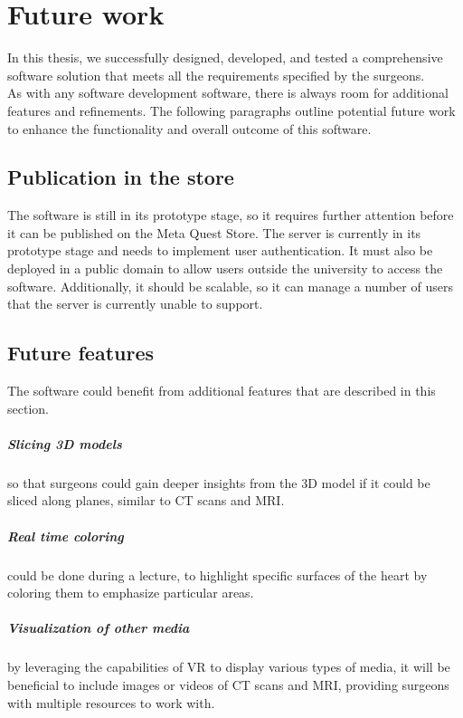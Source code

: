 
\chapter{Future work}
\label{chp:conclusions}
\noindent
In this thesis, we successfully designed, developed, and tested a comprehensive software solution that meets all the requirements specified by the surgeons.\\
As with any software development software, there is always room for additional features and refinements. The following paragraphs outline potential future work to enhance the functionality and overall outcome of this software.

\section{Publication in the store}
\noindent
The software is still in its prototype stage, so it requires further attention before it can be published on the Meta Quest Store.
The server is currently in its prototype stage and needs to implement user authentication. It must also be deployed in a public domain to allow users outside the university to access the software.
Additionally, it should be scalable, so it can manage a number of users that the server is currently unable to support.


\section{Future features}
\noindent
The software could benefit from additional features that are described in this section.

\paragraph{Slicing 3D models}
so that surgeons could gain deeper insights from the 3D model if it could be sliced along planes, similar to \ac{CT} scans and \ac{MRI}.

\paragraph{Real time coloring}
could be done during a lecture, to highlight specific surfaces of the heart by coloring them to emphasize particular areas.

\paragraph{Visualization of other media}
by leveraging the capabilities of \ac{VR} to display various types of media, it will be beneficial to include images or videos of \ac{CT} scans and \ac{MRI}, providing surgeons with multiple resources to work with.

